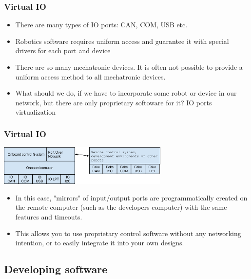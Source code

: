 \documentclass{beamer}
\begin{document}
\begin{frame}
\frametitle{Virtual IO} 
\begin{itemize}
  \item<1> There are many types of IO ports: CAN, COM, USB etc.
  \item<1> Robotics software requires uniform access and guarantee it with
  special drivers for each port and device
  \item<1> There are so many mechatronic devices. It is often not possible to
  provide a uniform access method to all mechatronic devices.
  \item<1> What should we do, if we have to incorporate some robot or device in
  our network, but there are only proprietary softoware for it? \alert{IO ports
  virtualization}
\end{itemize} 
\end{frame}


\begin{frame}
\frametitle{Virtual IO} 
\includegraphics[width=8.5cm]{io.png}
\begin{itemize}
  \item<1> 
     In this case, "mirrors" of input/output ports are programmatically created
     on the remote computer (such as the developers computer) with the same features and timeouts.
  \item<1>      
     This allows you to use proprietary control software without any networking intention, or to easily integrate it into your own designs.
\end{itemize}

\end{frame}

\subsection{Developing software}
\end{document}
